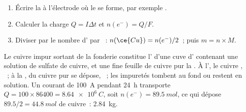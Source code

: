 \begin{method}\label{met:g12:cells-and-electrolysis:mass}
\begin{enumerate}
  \item Écrire la  à l'électrode où le  se forme, par
        exemple .
  \item Calculer la charge $Q = I \Delta t$ et $n(e^-) = Q/F$.
  \item Diviser par le nombre d' par ~: $n(\ce{Cu}) =
        n(e^-)/2$~; puis $m = n \times M$.
\end{enumerate}
\end{method}


\begin{example}\label{ex:g12:cells-and-electrolysis:refining}
Le cuivre impur sortant de la fonderie constitue l' d'une cuve
d' contenant une solution de sulfate de cuivre, et une fine
feuille de cuivre pur la . À l', le cuivre ,
~; à la , du cuivre pur se dépose,
~; les impuretés tombent au fond ou restent en
solution. Un courant de \qty{100}{A} pendant
\qty{24}{h} transporte $Q = 100 \times 86400 = \qty{8.64e6}{C}$, soit
$n(e^-) = \qty{89.5}{mol}$, ce qui dépose $89.5/2 = \qty{44.8}{mol}$ de
cuivre~: \qty{2.84}{kg}.
\end{example}

